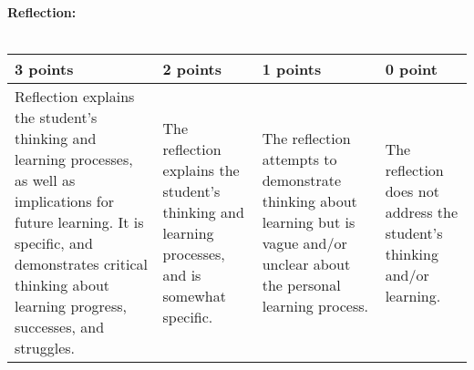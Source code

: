 \documentclass[12pt,landscape]{article}
\begin{document}
\bigskip
\bigskip
{\large \textbf{ Reflection:}}\\~\\
{\renewcommand{\arraystretch}{2}
\begin{tabular}{|p{5cm}|p{5cm}|p{5cm}|p{5cm}|}
\hline
 {\bf 3 points} & {\bf 2 points} & {\bf 1 points} & {\bf 0 point} \\
\hline

Reflection explains the student's thinking and learning processes, as well as implications for future learning. It is specific, and demonstrates critical thinking about learning progress, successes, and struggles.& 
The reflection explains the student's thinking and learning processes, and is somewhat specific.&
The reflection attempts to demonstrate thinking about learning but is vague and/or unclear about the personal learning process.&
The reflection does not address the student's thinking and/or learning.\\
\hline
 \end{tabular}
}
\end{document}
